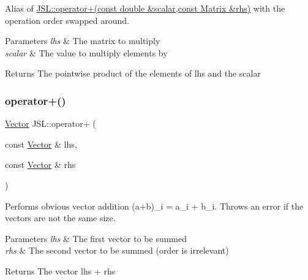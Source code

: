 Alias of \hyperlink{namespaceJSL_a5f6c1988cf84b088617e0f12fc1e98da}{J\+S\+L\+::operator+(const double \&scalar,const Matrix \&rhs)} with the operation order swapped around. 


\begin{DoxyParams}{Parameters}
{\em lhs} & The matrix to multiply \\
\hline
{\em scalar} & The value to multiply elements by \\
\hline
\end{DoxyParams}
\begin{DoxyReturn}{Returns}
The pointwise product of the elements of lhs and the scalar 
\end{DoxyReturn}
\mbox{\label{namespaceJSL_ae6530b77174d0dfae8e0d6e2a810f672}} 
\subsubsection{\texorpdfstring{operator+()}{operator+()}\hspace{0.1cm}{\footnotesize\ttfamily [1/6]}}
{\footnotesize\ttfamily \hyperlink{classJSL_1_1Vector}{Vector} J\+S\+L\+::operator+ (\begin{DoxyParamCaption}\item[{const \hyperlink{classJSL_1_1Vector}{Vector} \&}]{lhs,  }\item[{const \hyperlink{classJSL_1_1Vector}{Vector} \&}]{rhs }\end{DoxyParamCaption})\hspace{0.3cm}{\ttfamily [inline]}}



Performs obvious vector addition (a+b)\+\_\+i = a\+\_\+i + b\+\_\+i. Throws an error if the vectors are not the same size. 


\begin{DoxyParams}{Parameters}
{\em lhs} & The first vector to be summed \\
\hline
{\em rhs} & The second vector to be summed (order is irrelevant) \\
\hline
\end{DoxyParams}
\begin{DoxyReturn}{Returns}
The vector lhs + rhs 
\end{DoxyReturn}
\mbox{\label{namespaceJSL_a4b293e2ac3df51113e80022cb3c2ac99}} 
